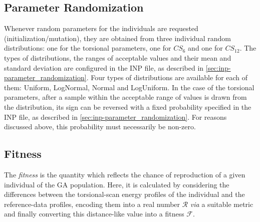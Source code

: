 \documentclass[10pt,a4paper]{report}
\numberwithin{equation}{section}
\begin{document}
\subsection{Parameter Randomization}
\label{sec:ga-parameter-randomization}

Whenever random parameters for the individuals are requested
(initialization/mutation), they are obtained from three individual
random distributions: one for the torsional parameters, one for $CS_6$
and one for $CS_{12}$. The types of distributions, the ranges of
acceptable values and their mean and standard deviation are configured
in the INP file, as described in
\autoref{sec:inp-parameter_randomization}.  Four types of
distributions are available for each of them: Uniform, LogNormal,
Normal and LogUniform. In the case of the torsional parameters, after
a sample within the acceptable range of values is drawn from the
distribution, its sign can be reversed with a fixed probability
specified in the INP file, as described in
\autoref{sec:inp-parameter_randomization}. For reasons discussed
above, this probability must necessarily be non-zero.

\subsection{Fitness}
\label{sec:ga-fitness}

The \textit{fitness} is the quantity which reflects the chance of
reproduction of a given individual of the GA population.  Here, it is
calculated by considering the differences between the torsional-scan
energy profiles of the individual and the reference-data profiles,
encoding them into a real number $\mathcal{R}$ \textit{via} a suitable
metric and finally converting this distance-like value into a fitness
$\mathcal{F}$.
\end{document}
